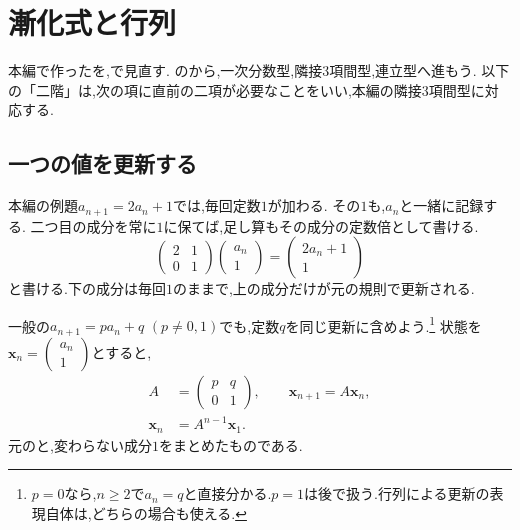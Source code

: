 
\section{漸化式と行列}\label{節：特性方程式を行列で見直す}

本編で作ったを,で見直す.
のから,一次分数型,隣接3項間型,連立型へ進もう.
以下の「二階」は,次の項に直前の二項が必要なことをいい,本編の隣接3項間型に対応する.

\subsection{一つの値を更新する}\label{節：一つの値の更新を行列で書く}

本編の例題$a_{n+1}=2a_n+1$では,毎回定数$1$が加わる.
その$1$も,$a_n$と一緒に記録する.
二つ目の成分を常に$1$に保てば,足し算もその成分の定数倍として書ける.
\[
  \begin{pmatrix}2&1\\0&1\end{pmatrix}
  \begin{pmatrix}a_n\\1\end{pmatrix}
  =\begin{pmatrix}2a_n+1\\1\end{pmatrix}
\]
と書ける.下の成分は毎回$1$のままで,上の成分だけが元の規則で更新される.

一般の$a_{n+1}=pa_n+q$ $(p\ne0,1)$でも,定数$q$を同じ更新に含めよう.\footnote{$p=0$なら,$n\ge2$で$a_n=q$と直接分かる.$p=1$は後で扱う.行列による更新の表現自体は,どちらの場合も使える.}
状態を$\boldsymbol{x}_n=\begin{pmatrix}a_n\\1\end{pmatrix}$とすると,
\[
  \begin{aligned}
    A&=\begin{pmatrix}p&q\\0&1\end{pmatrix},\qquad
    \boldsymbol{x}_{n+1}=A\boldsymbol{x}_n,\\
    \boldsymbol{x}_n&=A^{n-1}\boldsymbol{x}_1.
  \end{aligned}
\]
元のと,変わらない成分$1$をまとめたものである.

